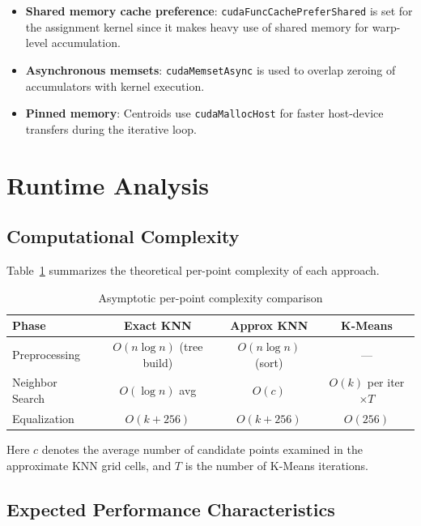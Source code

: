 \documentclass[11pt,a4paper]{article}
\begin{document}
\begin{itemize}
    \item \textbf{Shared memory cache preference}: \texttt{cudaFuncCachePreferShared} is set for the assignment kernel since it makes heavy use of shared memory for warp-level accumulation.
    \item \textbf{Asynchronous memsets}: \texttt{cudaMemsetAsync} is used to overlap zeroing of accumulators with kernel execution.
    \item \textbf{Pinned memory}: Centroids use \texttt{cudaMallocHost} for faster host-device transfers during the iterative loop.
\end{itemize}

\section{Runtime Analysis}

\subsection{Computational Complexity}

Table~\ref{tab:complexity} summarizes the theoretical per-point complexity of each approach.

\begin{table}[H]
    \centering
    \caption{Asymptotic per-point complexity comparison}
    \label{tab:complexity}
    \begin{tabular}{@{}lccc@{}}
        \toprule
        \textbf{Phase} & \textbf{Exact KNN} & \textbf{Approx KNN} & \textbf{K-Means} \\
        \midrule
        Preprocessing  & $O(n \log n)$ (tree build) & $O(n \log n)$ (sort) & --- \\
        Neighbor Search & $O(\log n)$ avg & $O(c)$ & $O(k)$ per iter $\times T$ \\
        Equalization    & $O(k + 256)$ & $O(k + 256)$ & $O(256)$ \\
        \bottomrule
    \end{tabular}
\end{table}

Here $c$ denotes the average number of candidate points examined in the approximate KNN grid cells, and $T$ is the number of K-Means iterations.

\subsection{Expected Performance Characteristics}
\end{document}
